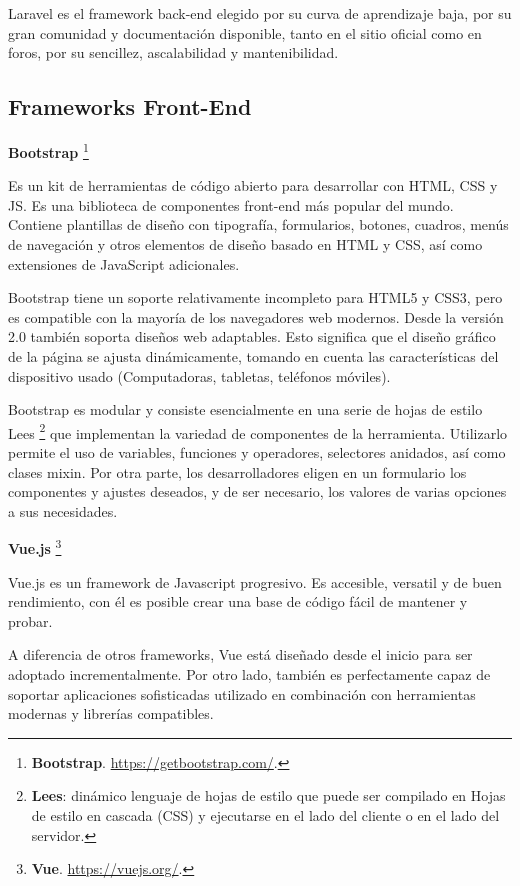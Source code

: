 \documentclass[11pt,oneside]{book}
\begin{document}
Laravel es el framework back-end elegido por su curva de aprendizaje baja, por su gran comunidad y documentación disponible, tanto en el sitio oficial como en foros, por su sencillez, ascalabilidad y mantenibilidad.

\newpage
\subsection{Frameworks Front-End}
\textbf{Bootstrap} \footnote{\textbf{Bootstrap}. \url{https://getbootstrap.com/}.}

Es un kit de herramientas de código abierto para desarrollar con HTML, CSS y JS. Es una biblioteca de componentes front-end más popular del mundo. Contiene plantillas de diseño con tipografía, formularios, botones, cuadros, menús de navegación y otros elementos de diseño basado en HTML y CSS, así como extensiones de JavaScript adicionales.

Bootstrap tiene un soporte relativamente incompleto para HTML5 y CSS3, pero es compatible con la mayoría de los navegadores web modernos. Desde la versión 2.0 también soporta diseños web adaptables. Esto significa que el diseño gráfico de la página se ajusta dinámicamente, tomando en cuenta las características del dispositivo usado (Computadoras, tabletas, teléfonos móviles).

Bootstrap es modular y consiste esencialmente en una serie de hojas de estilo Lees \footnote{\textbf{Lees}: dinámico lenguaje de hojas de estilo que puede ser compilado en Hojas de estilo en cascada (CSS) y ejecutarse en el lado del cliente o en el lado del servidor.} que implementan la variedad de componentes de la herramienta. Utilizarlo permite el uso de variables, funciones y operadores, selectores anidados, así como clases mixin. Por otra parte, los desarrolladores eligen en un formulario los componentes y ajustes deseados, y de ser necesario, los valores de varias opciones a sus necesidades.

\textbf{Vue.js} \footnote{\textbf{Vue}. \url{https://vuejs.org/}.}

Vue.js es un framework de Javascript progresivo. Es accesible, versatil y de buen rendimiento, con él es posible crear una base de código fácil de mantener y probar.

A diferencia de otros frameworks, Vue está diseñado desde el inicio para ser adoptado incrementalmente. Por otro lado, también es perfectamente capaz de soportar aplicaciones sofisticadas utilizado en combinación con herramientas modernas y librerías compatibles.
\end{document}
